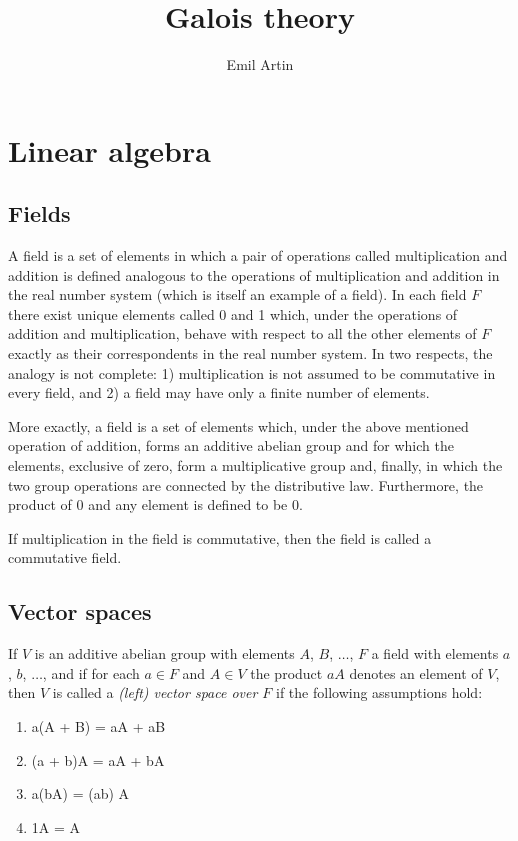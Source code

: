 \documentclass[10pt,leqno,a5paper]{book}
\author{Emil Artin}
\title{Galois theory}
\date{}
\theoremstyle{definition}
\let\hon\chapter
\let\htw\section
\begin{document}
\pagestyle{empty}
\frontmatter
\maketitle

\small
\tableofcontents
\thispagestyle{empty}
\normalsize





\mainmatter
\pagestyle{fancy}


\hon{Linear algebra}
\thispagestyle{empty}


\htw{Fields}


A field is a set of elements in which a pair of operations called multiplication and addition is defined analogous to the operations of multiplication and addition in the real number system (which is itself an example of a field).
In each field $F$ there exist unique elements called 0 and 1 which, under the operations of addition and multiplication, behave with respect to all the other elements of $F$ exactly as their correspondents in the real number system.
In two respects, the analogy is not complete: 1) multiplication is not assumed to be commutative in every field, and 2) a field may have only a finite number of elements.

More exactly, a field is a set of elements which, under the above mentioned operation of addition, forms an additive abel\-ian group and for which the elements, exclusive of zero, form a multiplicative group and, finally, in which the two group operations are connected by the distributive law.
Furthermore, the product of 0 and any element is defined to be 0.

If multiplication in the field is commutative, then the field is called a commutative field.


\htw{Vector spaces}

If $V$ is an additive abelian group with elements $A$, $B$, $\ldots$, $F$ a field with elements $a$, $b$, $\ldots$, and if for each $a \in F$ and $A \in V$ the product $aA$ denotes an element of $V$, then $V$ is called a \emph{(left) vector space over $F$} if the following assumptions hold:

\begin{enumerate}
\item
a(A + B) = aA + aB

\item
(a + b)A = aA + bA

\item
a(bA) = (ab) A

\item
1A = A
\end{enumerate}
\end{document}
